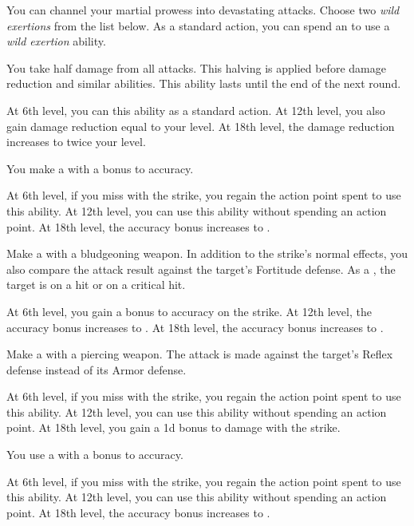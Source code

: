         You can channel your martial prowess into devastating attacks.
        Choose two \textit{wild exertions} from the list below.
        As a standard action, you can spend an  to use a \textit{wild exertion} ability.
        {
             You take half damage from all attacks.
            This halving is applied before damage reduction and similar abilities.
            This ability lasts until the end of the next round.
            \par At 6th level, you can  this ability as a standard action.
            At 12th level, you also gain damage reduction equal to your level.
            At 18th level, the damage reduction increases to twice your level.

             You make a  with a  bonus to accuracy.
            \par At 6th level, if you miss with the strike, you regain the action point spent to use this ability.
            At 12th level, you can use this ability without spending an action point.
            At 18th level, the accuracy bonus increases to .

             Make a  with a bludgeoning weapon.
            In addition to the strike's normal effects, you also compare the attack result against the target's Fortitude defense.
            As a , the target is \sickened on a hit or \nauseated on a critical hit.
            \par At 6th level, you gain a  bonus to accuracy on the strike.
            At 12th level, the accuracy bonus increases to .
            At 18th level, the accuracy bonus increases to .

             Make a  with a piercing weapon.
            The attack is made against the target's Reflex defense instead of its Armor defense.
            \par At 6th level, if you miss with the strike, you regain the action point spent to use this ability.
            At 12th level, you can use this ability without spending an action point.
            At 18th level, you gain a \plus1d bonus to damage with the strike.

             You use a  with a  bonus to accuracy.
            \par At 6th level, if you miss with the strike, you regain the action point spent to use this ability.
            At 12th level, you can use this ability without spending an action point.
            At 18th level, the accuracy bonus increases to .

}
